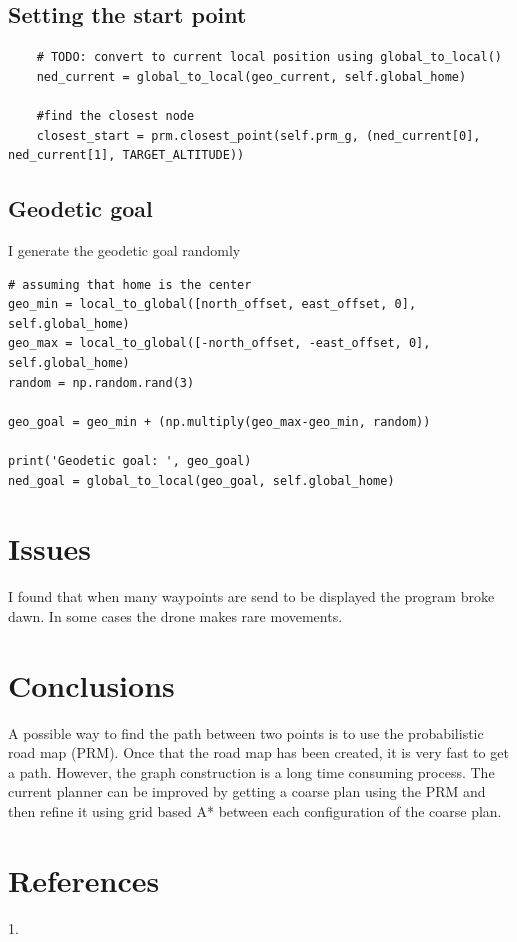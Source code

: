 \documentclass[]{article}
\begin{document}
\subsection{Setting the start point}

\begin{verbatim}
	# TODO: convert to current local position using global_to_local()
	ned_current = global_to_local(geo_current, self.global_home)
	
	#find the closest node
	closest_start = prm.closest_point(self.prm_g, (ned_current[0], ned_current[1], TARGET_ALTITUDE))
\end{verbatim}

\subsection{Geodetic goal}

I generate the geodetic goal randomly

\begin{verbatim}
# assuming that home is the center
geo_min = local_to_global([north_offset, east_offset, 0], self.global_home)
geo_max = local_to_global([-north_offset, -east_offset, 0], self.global_home)
random = np.random.rand(3)

geo_goal = geo_min + (np.multiply(geo_max-geo_min, random))

print('Geodetic goal: ', geo_goal)
ned_goal = global_to_local(geo_goal, self.global_home)

\end{verbatim}

\section{Issues}

I found that when many waypoints are send to be displayed the program broke dawn. In some cases the drone makes rare movements. 

\section{Conclusions}

A possible way to find the path between two points is to use the probabilistic road map (PRM). Once that the road map has been created, it is very fast to get a path. However, the graph construction is a long time consuming process. The current planner can be improved by getting a coarse plan using the PRM and then refine it using grid based A* between each configuration of the coarse plan.

\section{References}

1. 
\end{document}
